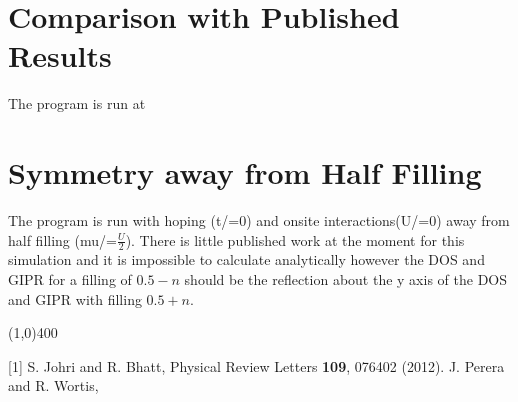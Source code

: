 \documentclass{article}
\begin{document}
\section{Comparison with Published Results}
The program is run at 
\section{Symmetry away from Half Filling}
The program is run with hoping (t/=0) and onsite interactions(U/=0) away from half filling (mu/=$\frac{U}{2}$). There is little published work at the moment for this simulation and it is impossible to calculate analytically however the DOS and GIPR for a filling of $0.5-n$ should be the reflection about the y axis of the DOS and GIPR with filling $0.5+n$.
\begin{center}
	\line(1,0){400}
\end{center}
[1] S. Johri and R. Bhatt, Physical Review Letters \textbf{109}, 076402 (2012). \newline
[2] J. Perera and R. Wortis,
\end{document}
